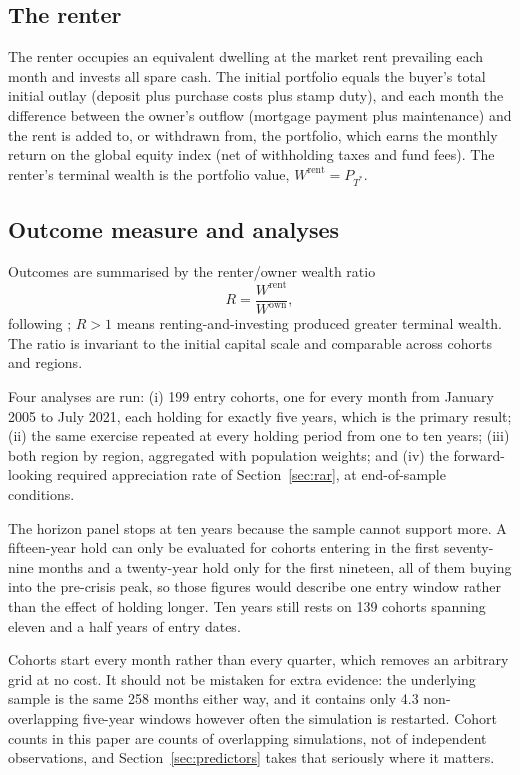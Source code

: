 \subsection{The renter}

The renter occupies an equivalent dwelling at the market rent prevailing each month and invests all spare cash. The initial portfolio equals the buyer's total initial outlay (deposit plus purchase costs plus stamp duty), and each month the difference between the owner's outflow (mortgage payment plus maintenance) and the rent is added to, or withdrawn from, the portfolio, which earns the monthly return on the global equity index (net of withholding taxes and fund fees). The renter's terminal wealth is the portfolio value, $W^{\text{rent}} = P_{T^{*}}$. 

\subsection{Outcome measure and analyses}

Outcomes are summarised by the renter/owner wealth ratio
\begin{equation}
  R = \frac{W^{\text{rent}}}{W^{\text{own}}},
  \label{eq:ratio}
\end{equation}
following \textcite{felix2025}; $R > 1$ means renting-and-investing produced greater terminal wealth. The ratio is invariant to the initial capital scale and comparable across cohorts and regions.

Four analyses are run: (i) 199 entry cohorts, one for every month from January 2005 to July 2021, each holding for exactly five years, which is the primary result; (ii) the same exercise repeated at every holding period from one to ten years; (iii) both region by region, aggregated with population weights; and (iv) the forward-looking required appreciation rate of Section~\ref{sec:rar}, at end-of-sample conditions.

The horizon panel stops at ten years because the sample cannot support more. A fifteen-year hold can only be evaluated for cohorts entering in the first seventy-nine months and a twenty-year hold only for the first nineteen, all of them buying into the pre-crisis peak, so those figures would describe one entry window rather than the effect of holding longer. Ten years still rests on 139 cohorts spanning eleven and a half years of entry dates.

Cohorts start every month rather than every quarter, which removes an arbitrary grid at no cost. It should not be mistaken for extra evidence: the underlying sample is the same 258 months either way, and it contains only 4.3 non-overlapping five-year windows however often the simulation is restarted. Cohort counts in this paper are counts of overlapping simulations, not of independent observations, and Section~\ref{sec:predictors} takes that seriously where it matters.


